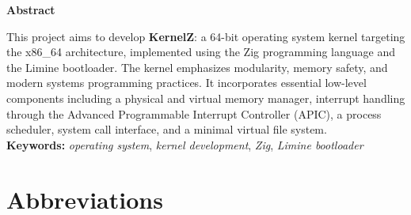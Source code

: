 \documentclass[12pt]{extarticle}
\begin{document}
\begin{center}
	\textbf{Abstract}
\end{center}
This project aims to develop \textbf{KernelZ}: a 64-bit operating system kernel
targeting the x86\_64 architecture, implemented using the Zig programming
language and the Limine bootloader. The kernel emphasizes modularity, memory
safety, and modern systems programming practices. It incorporates essential
low-level components including a physical and virtual memory manager, interrupt
handling through the Advanced Programmable Interrupt Controller (APIC), a
process scheduler, system call interface, and a minimal virtual file system.\\
\textbf{Keywords:} \textit{operating system}, \textit{kernel development}, \textit{Zig}, \textit{Limine bootloader}

\pagebreak

\tableofcontents

\pagebreak

\listoffigures

\pagebreak

\listoftables

\pagebreak

\renewcommand{\arraystretch}{1.5} %
\section*{Abbreviations}
\end{document}
